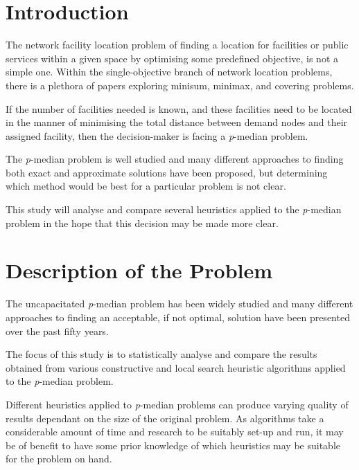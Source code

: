 \documentclass[11pt]{article}
\newcommand{\np}{\newpage}
\begin{document}
	\tableofcontents
	\thispagestyle{empty}
	\np

\setcounter{page}{1}		
	\section{Introduction} \label{introduction}
	The network facility location problem of finding a location for facilities or public services within a given space by optimising some predefined objective, is not a simple one.  Within the single-objective branch of network location problems, there is a plethora of papers exploring minisum, minimax, and covering problems.
	
	If the number of facilities needed is known, and these facilities need to be located in the manner of minimising the total distance between demand nodes and their assigned facility, then the decision-maker is facing a \emph{p}-median problem.
	
	The \emph{p}-median problem  is well studied and many different approaches to finding both exact and approximate solutions have been proposed, but determining which method would be best for a particular problem is not clear.
	
	This study will analyse and compare several heuristics applied to the \emph{p}-median problem in the hope that this decision may be made more clear.	
	
	
	\section{Description of the Problem} \label{problem.statement}
	The uncapacitated \emph{p}-median problem has been widely studied and many different approaches to finding an acceptable, if not optimal, solution have been presented over the past fifty years.
	
	The focus of this study is to statistically analyse and compare the results obtained from various constructive and local search heuristic algorithms applied to the \emph{p}-median problem.
	
	Different heuristics applied to \emph{p}-median problems can produce varying quality of results dependant on the size of the original problem.  As algorithms take a considerable amount of time and research to be suitably set-up and run, it may be of benefit to have some prior knowledge of which heuristics may be suitable for the problem on hand.
	
\end{document}

